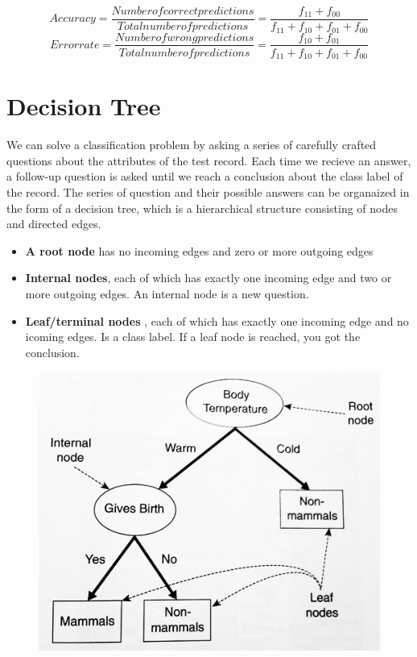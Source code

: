 		\begin{equation}
			Accuracy = \frac{Number of correct predictions}{Total number of predictions} =
			\frac{f_{11} + f_{00}}{f_{11} + f_{10} + f_{01} + f_{00}}
		\end{equation}
		\begin{equation}
			Error rate = \frac{Number of wrong predictions}{Total number of predictions} =
			\frac{f_{10} + f_{01}}{f_{11} + f_{10} + f_{01} + f_{00}}
		\end{equation}

	\section{Decision Tree}

		We can solve a classification problem by asking a series of carefully
		crafted questions about the attributes of the test record. 
		Each time we recieve an answer, a follow-up question is asked until
		we reach a conclusion about the class label of the record. The series
		of question and their possible answers can be organaized in the form of
		a decision tree, which is a hierarchical structure consisting of nodes
		and directed edges.

		\begin{itemize}
			\item {\bf A root node} has no incoming edges and zero or more outgoing edges
			\item {\bf Internal nodes}, each of which has exactly one incoming edge and 
			two or more outgoing edges. An internal node is a new question.  
			\item{\bf Leaf/terminal nodes} , each of which has exactly one incoming edge
			and no icoming edges. Is a class label. If a leaf node is reached, you got the
			conclusion. 
		\end{itemize}

		\begin{figure}[H]
			\centering
			\includegraphics[scale=0.4]{pics/decision.png}
		\end{figure}

